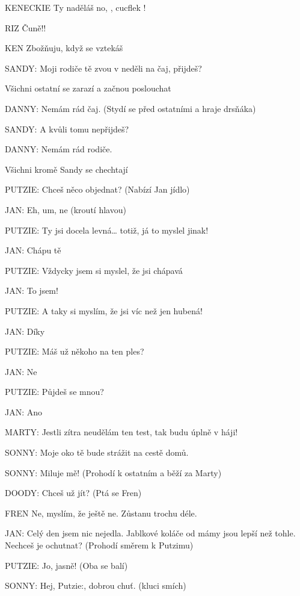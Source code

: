 KENECKIE        Ty naděláš no, , cucflek ! 

RIZ                Čuně!! 

KEN        Zbožňuju, když se vztekáš 

\rep SANDY:        Moji rodiče tě zvou v neděli na čaj, přijdeš? 

Všichni ostatní se zarazí a začnou poslouchat 

\rep DANNY:        Nemám rád čaj. (Stydí se před ostatními a hraje drsňáka) 

\rep SANDY:         A kvůli tomu nepřijdeš? 

\rep DANNY:        Nemám rád rodiče. 

Všichni kromě Sandy se chechtají 

\rep PUTZIE:        Chceš něco objednat? (Nabízí Jan jídlo) 

\rep JAN:        Eh, um, ne (kroutí hlavou) 

\rep PUTZIE:         Ty jsi docela levná… totiž, já to myslel jinak! 

\rep JAN:        Chápu tě 

\rep PUTZIE:        Vždycky jsem si myslel, že jsi chápavá 

\rep JAN:        To jsem! 

\rep PUTZIE:        A taky si myslím, že jsi víc než jen hubená!

\rep JAN:        Díky 

\rep PUTZIE:         Máš už někoho na ten ples? 

\rep JAN:        Ne

\rep PUTZIE:        Půjdeš se mnou? 

\rep JAN:        Ano 

\rep MARTY:        Jestli zítra neudělám ten test, tak budu úplně v háji!

\rep SONNY:        Moje oko tě bude strážit na cestě domů. 

\rep SONNY:        Miluje mě! (Prohodí k ostatním a běží za Marty) 

\rep DOODY:        Chceš už jít? (Ptá se Fren)

FREN        Ne, myslím, že ještě ne. Zůstanu trochu déle. 

\rep JAN:        Celý den jsem nic nejedla. Jablkové koláče od mámy jsou lepší než                 tohle. Nechceš je ochutnat? (Prohodí směrem k Putzimu) 

\rep PUTZIE:         Jo, jasně! (Oba se balí) 

\rep SONNY:        Hej, \rep Putzie:, dobrou chuť. (kluci smích)

